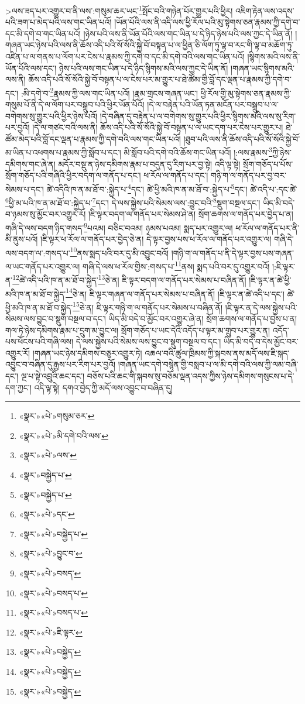  >ལས་ཟད་པར་འགྱུར་བ་ནི་ལས་:གསུམ་ཆར་ཡང་\footnote{«སྣར་»«པེ་»གསུམ་ཅར་}སྤོང་བའི་གཉེན་པོར་གྱུར་པའི་ཕྱིར། འཇིག་རྟེན་ལས་འདས་པའི་ཟག་པ་མེད་པའི་ལས་གང་ཡིན་པའོ། །ཡོན་པོའི་ལས་ནི་འདི་ལས་ཕྱི་རོལ་པའི་མུ་སྟེགས་ཅན་རྣམས་ཀྱི་དགེ་བ་དང་མི་དགེ་བ་གང་ཡིན་པའོ། །ཉེས་པའི་ལས་ནི་ཡོན་པོའི་ལས་གང་ཡིན་པ་དེ་ཉིད་ཉེས་པའི་ལས་ཀྱང་དེ་ཡིན་ནོ། །གཞན་ཡང་ཉེས་པའི་ལས་ནི་ཆོས་འདི་པའི་སོ་སོའི་སྐྱེ་བོ་བསྟན་པ་ལ་ཕྱིན་ཅི་ལོག་ཏུ་ལྟ་བ་རང་གི་ལྟ་བ་མཆོག་ཏུ་འཛིན་པ་ལ་གནས་པ་ལོག་པར་ངེས་པ་རྣམས་ཀྱི་དགེ་བ་དང་མི་དགེ་བའི་ལས་གང་ཡིན་པའོ། །སྙིགས་མའི་ལས་ནི་ཡོན་པོའི་ལས་དང་། ཉེས་པའི་ལས་གང་ཡིན་པ་དེ་ཉིད་སྙིགས་མའི་ལས་ཀྱང་དེ་ཡིན་ནོ། །གཞན་ཡང་སྙིགས་མའི་ལས་ནི། ཆོས་འདི་པའི་སོ་སོའི་སྐྱེ་བོ་བསྟན་པ་ལ་ངེས་པར་མ་གྱུར་པ་ཐེ་ཚོམ་གྱི་བློ་དང་ལྡན་པ་རྣམས་ཀྱི་དགེ་བ་དང་། :མི་དགེ་བ་\footnote{«སྣར་»«པེ་»མི་དགེ་བའི་ལས་}རྣམས་ཀྱི་ལས་གང་ཡིན་པའོ། །རྣམ་གྲངས་གཞན་ཡང་། ཕྱི་རོལ་གྱི་མུ་སྟེགས་ཅན་རྣམས་ཀྱི་གསུམ་པོ་ནི་དེ་ལ་ལོག་པར་བསྒྲུབ་པའི་ཕྱིར་ཡོན་པོའོ། །དེ་ལ་བརྟེན་པའི་ཡོན་ཏན་མངོན་པར་བསྒྲུབ་པ་ལ་བགེགས་སུ་གྱུར་པའི་ཕྱིར་ཉེས་པའོ། །དེ་བཞིན་དུ་བརྟེན་པ་ལ་བགེགས་སུ་གྱུར་པའི་ཕྱིར་སྙིགས་མའི་ལས་སུ་རིག་པར་བྱའོ། །དེ་ལ་གཙང་བའི་ལས་ནི། ཆོས་འདི་པའི་སོ་སོའི་སྐྱེ་བོ་བསྟན་པ་ལ་ཡང་དག་པར་ངེས་པར་གྱུར་པ། ཐེ་ཚོམ་མེད་པའི་བློ་དང་ལྡན་པ་རྣམས་ཀྱི་དགེ་བའི་ལས་གང་ཡིན་པའོ། །ཐུབ་པའི་ལས་ནི་ཆོས་འདི་པའི་སོ་སོའི་སྐྱེ་བོ་མ་ཡིན་པ་འཕགས་པ་རྣམས་ཀྱི་སློབ་པ་དང་། མི་སློབ་པའི་དགེ་བའི་ཆོས་གང་ཡིན་པའོ། །:ལས་རྣམས་\footnote{«སྣར་»«པེ་»ལས་}ཀྱི་ཉེས་དམིགས་གང་ཞེ་ན། མདོར་བསྡུ་ན་ཉེས་དམིགས་རྣམ་པ་བདུན་དུ་རིག་པར་བྱ་སྟེ། འདི་ལྟ་སྟེ། སྲོག་གཅོད་པ་པོས་སྲོག་གཅོད་པའི་གཞིའི་ཕྱིར་བདག་ལ་གནོད་པ་དང་། ཕ་རོལ་ལ་གནོད་པ་དང་། གཉི་ག་ལ་གནོད་པར་བྱ་བར་སེམས་པ་དང་། ཚེ་འདིའི་ཁ་ན་མ་ཐོ་བ་:སྐྱེད་པ་\footnote{«སྣར་»བསྐྱེད་པ་}དང་། ཚེ་ཕྱི་མའི་ཁ་ན་མ་ཐོ་བ་:སྐྱེད་པ་\footnote{«སྣར་»བསྐྱེད་པ་}དང་། ཚེ་འདི་པ་:དང་ཚེ་\footnote{«སྣར་»«པེ་»དང་}ཕྱི་མ་པའི་ཁ་ན་མ་ཐོ་བ་:སྐྱེད་པ་\footnote{«སྣར་»«པེ་»བསྐྱེད་པ་}དང་། དེ་ལས་སྐྱེས་པའི་སེམས་ལས་:བྱུང་བའི་\footnote{«སྣར་»«པེ་»བྱུང་བ་}སྡུག་བསྔལ་དང་། ཡིད་མི་བདེ་བ་ཉམས་སུ་མྱོང་བར་འགྱུར་རོ། །ཇི་ལྟར་བདག་ལ་གནོད་པར་སེམས་ཤེ་ན། སྲོག་ཆགས་ལ་གནོད་པར་བྱེད་པ་ན། གཞི་དེ་ལས་བདག་ཉིད་གསད་\footnote{«སྣར་»«པེ་»བསད་}པའམ། བཅིང་བའམ། ཉམས་པའམ། སྨད་པར་འགྱུར་ལ། ཕ་རོལ་ལ་གནོད་པར་ནི་མི་ནུས་པའོ། །ཇི་ལྟར་ཕ་རོལ་ལ་གནོད་པར་བྱེད་ཅེ་ན། དེ་ལྟར་བྱས་པས་ཕ་རོལ་ལ་གནོད་པར་འགྱུར་ལ། གཞི་དེ་ལས་བདག་ལ་:གསད་པ་\footnote{«སྣར་»«པེ་»བསད་པ་}ནས་སྨད་པའི་བར་དུ་མི་འབྱུང་བའོ། །གཉི་ག་ལ་གནོད་པ་ནི་དེ་ལྟར་བྱས་པས་གཞན་ལ་ཡང་གནོད་པར་འགྱུར་ལ། གཞི་དེ་ལས་ཕ་རོལ་གྱིས་:གསད་པ་\footnote{«སྣར་»«པེ་»བསད་པ་}ནས། སྨད་པའི་བར་དུ་འགྱུར་བའོ། །:ཇི་ལྟར་ན་\footnote{«སྣར་»«པེ་»ཇི་ལྟར་}ཚེ་འདི་པའི་ཁ་ན་མ་ཐོ་བ་སྐྱེད་\footnote{«སྣར་»«པེ་»བསྐྱེད་}ཅེ་ན། ཇི་ལྟར་བདག་ལ་གནོད་པར་སེམས་པ་བཞིན་ནོ། །ཇི་ལྟར་ན་ཚེ་ཕྱི་མའི་ཁ་ན་མ་ཐོ་བ་སྐྱེད་\footnote{«སྣར་»«པེ་»བསྐྱེད་}ཅེ་ན། ཇི་ལྟར་གཞན་ལ་གནོད་པར་སེམས་པ་བཞིན་ནོ། །ཇི་ལྟར་ན་ཚེ་འདི་པ་དང་། ཚེ་ཕྱི་མའི་ཁ་ན་མ་ཐོ་བ་སྐྱེད་\footnote{«སྣར་»«པེ་»བསྐྱེད་}ཅེ་ན། ཇི་ལྟར་གཉི་ག་ལ་གནོད་པར་སེམས་པ་བཞིན་ནོ། །ཇི་ལྟར་ན་དེ་ལས་སྐྱེས་པའི་སེམས་ལས་བྱུང་བ་སྡུག་བསྔལ་བ་དང་། ཡིད་མི་བདེ་བ་མྱོང་བར་འགྱུར་ཞེ་ན། སྲོག་ཆགས་ལ་གནོད་པ་བྱས་པ་ན། གལ་ཏེ་ཉེས་དམིགས་རྣམ་པ་དྲུག་མ་བྱུང་ལ། སྲོག་གཅོད་པ་ཡང་དེའི་འདོད་པ་ལྟར་མ་གྲུབ་པར་གྱུར་ན། འདོད་པས་ཕོངས་པའི་གཞི་ལས། དེ་ལས་སྐྱེས་པའི་སེམས་ལས་བྱུང་བ་སྡུག་བསྔལ་བ་དང་། ཡིད་མི་བདེ་བ་དེས་མྱོང་བར་འགྱུར་རོ། །གཞན་ཡང་ཉེས་དམིགས་བཅུར་འགྱུར་ཏེ། འཆལ་བའི་ཚུལ་ཁྲིམས་ཀྱི་སྐབས་ནས་མདོ་ལས་ཇི་སྐད་འབྱུང་བ་བཞིན་དུ་རྒྱས་པར་རིག་པར་བྱའོ། །གཞན་ཡང་དགེ་བསྙེན་གྱི་བསླབ་པ་ལ་མི་དགེ་བའི་ལས་ཀྱི་ལམ་བཞི་དང་། ལྔ་པ་སྟེ་འབྲུའི་ཆང་དང་། བཅོས་པའི་ཆང་གི་སྐབས་སུ་བཅོམ་ལྡན་འདས་ཀྱིས་ཉེས་དམིགས་གསུངས་པ་དེ་དག་ཀྱང་། འདི་ལྟ་སྟེ། དགའ་བྱེད་ཀྱི་མདོ་ལས་འབྱུང་བ་བཞིན་དུ། 